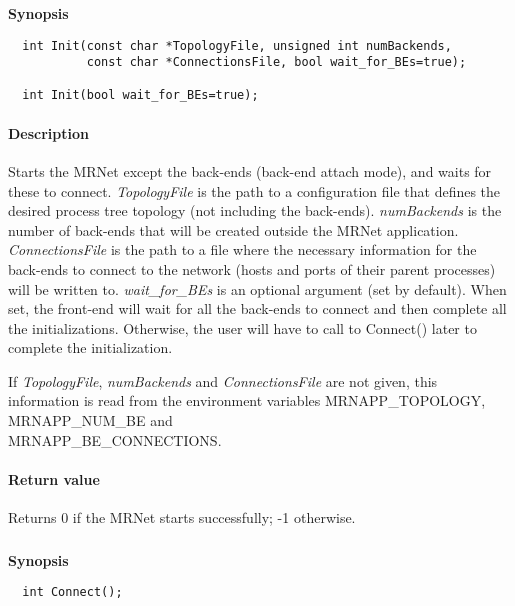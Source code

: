 \documentclass[twoside,a4,english,11pt]{book}
\begin{document}
\subsubsection{}

\textbf{Synopsis}

\begin{lstlisting}
  int Init(const char *TopologyFile, unsigned int numBackends, 
           const char *ConnectionsFile, bool wait_for_BEs=true);

  int Init(bool wait_for_BEs=true);
\end{lstlisting}

\paragraph{Description}
  Starts the MRNet except the back-ends (back-end attach mode), and waits for these to connect. \emph{TopologyFile} is the 
  path to a configuration file that defines the desired process tree topology (not including the back-ends). 
  \emph{numBackends} is the number of back-ends that will be created outside the MRNet application. \emph{ConnectionsFile} is the 
  path to a file where the necessary information for the back-ends to connect to the network (hosts and ports of 
  their parent processes) will be written to. \emph{wait\_for\_BEs} is an optional argument (set by default). When set, 
  the front-end will wait for all the back-ends to connect and then complete all the initializations. Otherwise, 
  the user will have to call to Connect() later to complete the initialization. 

  If \emph{TopologyFile}, \emph{numBackends} and \emph{ConnectionsFile} are not given, this information is read from the environment 
  variables MRNAPP\_TOPOLOGY, MRNAPP\_NUM\_BE and \\ MRNAPP\_BE\_CONNECTIONS.

\paragraph{Return value}
  Returns 0 if the MRNet starts successfully; -1 otherwise.

\subsubsection{} 
\textbf{Synopsis}
\begin{lstlisting}
  int Connect();
\end{lstlisting}
\end{document}
